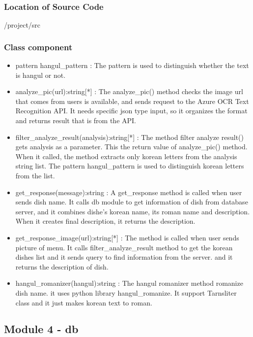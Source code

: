 \subsubsection {Location of Source Code}
/project/src

\subsubsection {Class component}


\begin{itemize}

\item pattern hangul\_pattern : The pattern is used to distinguish whether the text is hangul or not.
\item analyze\_pic(url):string[*] : The analyze\_pic() method checks the image url that comes from users is available, and sends request to the Azure OCR Text Recognition API. It needs specific json type input, so it organizes the format and returns result that is from the API.
\item filter\_analyze\_result(analysis):string[*] : The method filter analyze result() gets analysis as a parameter. This the return value of analyze\_pic() method. When it called, the method extracts only korean letters from the analysis string list. The pattern hangul\_pattern is used to distinguish korean letters from the list. 
\item get\_response(message):string : A get\_response method is called when user sends dish name. It calls db module to get information of dish from database server, and it combines dishe's korean name, its roman name and description. When it creates final description, it returns the description.
\item get\_response\_image(url):string[*] : The method is called when user sends picture of menu. It calls filter\_analyze\_result method to get the korean dishes list and it sends query to find information from the server. and it returns the description of dish.
\item hangul\_romanizer(hangul):string : The hangul romanizer method romanize dish name. it uses python library hangul\_romanize. It support Tarnsliter class and it just makes korean text to roman. 
\end{itemize} 

\FloatBarrier

\subsection{Module 4 - db}

